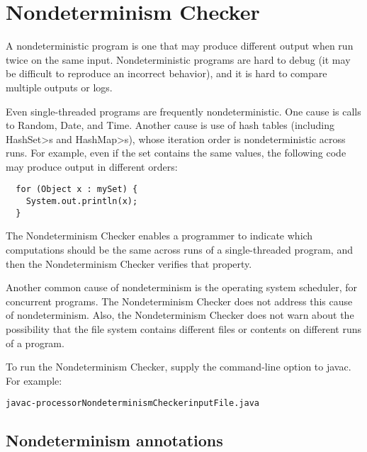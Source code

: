 \htmlhr
\chapter{Nondeterminism Checker\label{nondeterminism-checker}}

A nondeterministic program is one that may produce different output when
run twice on the same input.  Nondeterministic programs are hard to debug
(it may be difficult to reproduce an incorrect behavior), and it is hard to
compare multiple outputs or logs.

Even single-threaded programs are frequently nondeterministic.
One cause is calls to Random, Date, and Time.
Another cause is use of hash tables (including \<HashSet>s and
\<HashMap>s), whose iteration order is nondeterministic across runs.
For example, even if the set contains the same values, the following code
may produce output in different orders:

\begin{Verbatim}
  for (Object x : mySet) {
    System.out.println(x);
  }
\end{Verbatim}

The Nondeterminism Checker enables a programmer to indicate which
computations should be the same across runs of a single-threaded program,
and then the Nondeterminism Checker verifies that property.

Another common cause of nondeterminism is the operating system scheduler,
for concurrent programs.  The Nondeterminism Checker does not address this
cause of nondeterminism.  Also, the Nondeterminism Checker does not warn
about the possibility that the file system contains different files or
contents on different runs of a program.

To run the Nondeterminism Checker, supply the
command-line option to javac.
For example:

\begin{alltt}
  javac -processor NondeterminismChecker inputFile.java
\end{alltt}



\section{Nondeterminism annotations\label{nondeterminism-annotations}}

